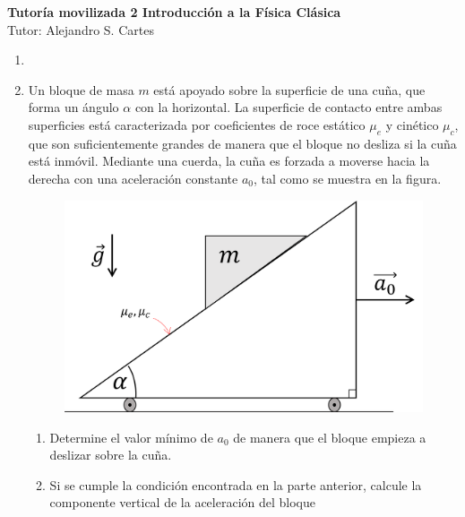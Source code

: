 \documentclass[letterpaper,11pt]{article}
\begin{document}
\begin{center}
	\LARGE\textbf{Tutoría movilizada 2 Introducción a la Física Clásica}\\
	\large{Tutor: Alejandro S. Cartes}
\end{center}

\vspace{-1cm}
\begin{enumerate}\setlength{\itemsep}{0.4cm}


\item[]

\item
\begin{multicols}{2}
    Un bloque de masa $m$ está apoyado sobre la superficie de una cuña, que forma un ángulo $\alpha$ con la horizontal. La superficie de contacto entre ambas superficies está caracterizada por coeficientes de roce estático $\mu_e$ y cinético $\mu_c$, que son suficientemente grandes de manera que el bloque no desliza si la cuña está inmóvil. Mediante una cuerda, la cuña es forzada a moverse hacia la derecha con una aceleración constante $a_0$, tal como se muestra en la figura. 

    \columnbreak

    \begin{figure}[H]
        \centering
        \includegraphics[width=0.8\linewidth]{2022-1/img/cepc/masa cunia.png}
    \end{figure}
\end{multicols}
    \begin{enumerate}
        \item Determine el valor mínimo de $a_0$ de manera que el bloque empieza a deslizar sobre la cuña.
        
        \item Si se cumple la condición encontrada en la parte anterior, calcule la componente vertical de la aceleración del bloque
    \end{enumerate}
    


\end{enumerate}
\end{document}
